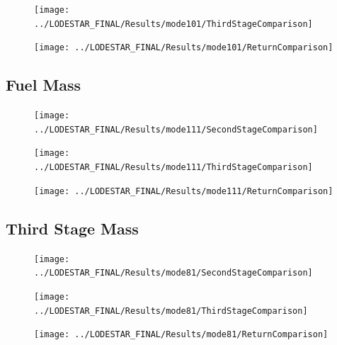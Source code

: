 \begin{figure}[th]
\centering
\texttt{[image: ../LODESTAR\_FINAL/Results/mode101/ThirdStageComparison]}
\caption{}
\label{fig:ThirdStageComparison12}
\end{figure}

\begin{figure}[th]
\centering
\texttt{[image: ../LODESTAR\_FINAL/Results/mode101/ReturnComparison]}
\caption{}
\label{fig:ReturnComparison12}
\end{figure}


\subsection{Fuel Mass}

\begin{figure}[th]
\centering
\texttt{[image: ../LODESTAR\_FINAL/Results/mode111/SecondStageComparison]}
\caption{}
\label{fig:SecondStageComparison13}
\end{figure}

\begin{figure}[th]
\centering
\texttt{[image: ../LODESTAR\_FINAL/Results/mode111/ThirdStageComparison]}
\caption{}
\label{fig:ThirdStageComparison13}
\end{figure}

\begin{figure}[th]
\centering
\texttt{[image: ../LODESTAR\_FINAL/Results/mode111/ReturnComparison]}
\caption{}
\label{fig:ReturnComparison13}
\end{figure}



\subsection{Third Stage Mass}
\begin{figure}[th]
\centering
\texttt{[image: ../LODESTAR\_FINAL/Results/mode81/SecondStageComparison]}
\caption{}
\label{fig:SecondStageComparison14}
\end{figure}

\begin{figure}[th]
\centering
\texttt{[image: ../LODESTAR\_FINAL/Results/mode81/ThirdStageComparison]}
\caption{}
\label{fig:ThirdStageComparison14}
\end{figure}



\begin{figure}[th]
	\centering
	\texttt{[image: ../LODESTAR\_FINAL/Results/mode81/ReturnComparison]}
	\caption{}
	\label{fig:ReturnComparison14}
\end{figure}

